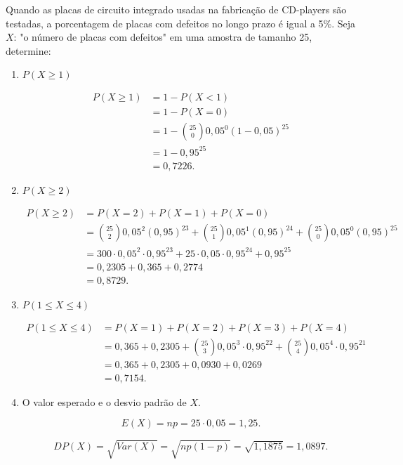 \begin{pageWidthArea}
	\begin{example}
		Quando as placas de circuito integrado usadas na fabricação de CD-players são testadas, a porcentagem de placas com defeitos no longo prazo é igual a 5\%. Seja $X$: "o número de placas com defeitos" em uma amostra de tamanho 25, determine:

		\begin{enumerate}[label=\alph*)]
			\item $P(X\geqslant 1)$\hfill
			
			\begin{align*}
				P(X\geqslant 1) &= 1 - P(X < 1)\\
					&= 1 - P(X=0)\\
					&= 1 - {25\choose 0} 0,05^0 (1-0,05)^{25}\\
					&=1-0,95^{25}\\
					&=0,7226\text{.}
			\end{align*}

			\item $P(X\geqslant 2)$\hfill
			
			\begin{align*}
				P(X\geqslant 2) &= P(X=2)+P(X=1)+P(X=0)\\
				&= {25\choose 2}0,05^2(0,95)^{23} + {25 \choose 1} 0,05^1(0,95)^{24}+ {25\choose 0}0,05^0(0,95)^25\\
				&= 300\cdot 0,05^2\cdot 0,95^{23} + 25\cdot 0,05\cdot 0,95^{24} + 0,95^{25}\\
				&= 0,2305 + 0,365 + 0,2774\\
				&=0,8729\text{.}
			\end{align*}

			\item $P(1\leqslant X \leqslant 4)$\hfill
			
			\begin{align*}
				P(1\leqslant X \leqslant 4) &= P(X=1) + P(X=2) + P(X=3) + P(X=4)\\
					&=0,365 + 0,2305 + {25\choose 3}0,05^3\cdot 0,95^{22} + {25\choose 4}0,05^4\cdot 0,95^{21}\\
					&=0,365+0,2305+0,0930+0,0269\\
					&=0,7154\text{.}
			\end{align*}

			\item O valor esperado e o desvio padrão de $X$.
			
			\[
				E(X)=np=25\cdot 0,05=1,25\text{.}
			\]

			\[
				DP(X)=\sqrt{Var(X)}=\sqrt{np(1-p)}=\sqrt{1,1875}=1,0897\text{.}
			\]
		\end{enumerate}
	\end{example}
\end{pageWidthArea}